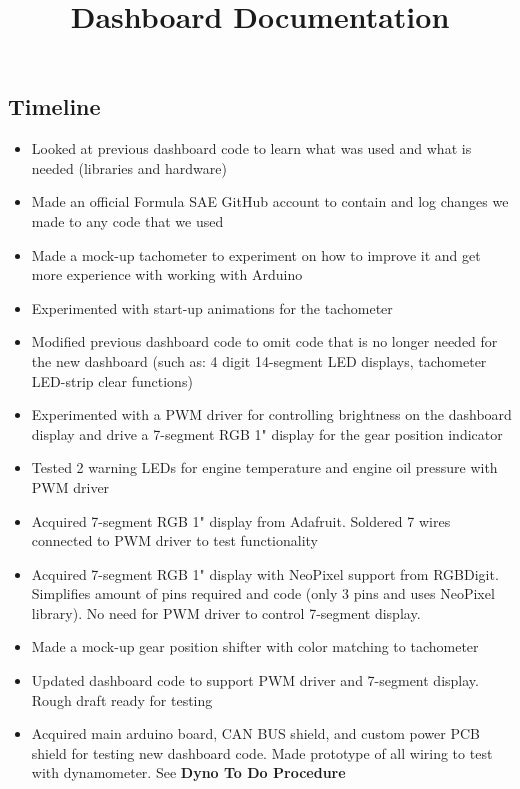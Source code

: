 \documentclass[11pt]{article}
\title{Dashboard Documentation}
\providecommand{\tightlist}{%
      \setlength{\itemsep}{0pt}\setlength{\parskip}{0pt}}
\begin{document}
    
    
    \maketitle
    
    

    
    \subsection{\texorpdfstring{\textbf{Timeline}}{Timeline}}\label{timeline}

\begin{itemize}
\tightlist
\item
  Looked at previous dashboard code to learn what was used and what is
  needed (libraries and hardware)
\item
  Made an official Formula SAE GitHub account to contain and log changes
  we made to any code that we used
\item
  Made a mock-up tachometer to experiment on how to improve it and get
  more experience with working with Arduino
\item
  Experimented with start-up animations for the tachometer
\item
  Modified previous dashboard code to omit code that is no longer needed
  for the new dashboard (such as: 4 digit 14-segment LED displays,
  tachometer LED-strip clear functions)
\item
  Experimented with a PWM driver for controlling brightness on the
  dashboard display and drive a 7-segment RGB 1" display for the gear
  position indicator
\item
  Tested 2 warning LEDs for engine temperature and engine oil pressure
  with PWM driver
\item
  Acquired 7-segment RGB 1" display from Adafruit. Soldered 7 wires
  connected to PWM driver to test functionality
\item
  Acquired 7-segment RGB 1" display with NeoPixel support from RGBDigit.
  Simplifies amount of pins required and code (only 3 pins and uses
  NeoPixel library). No need for PWM driver to control 7-segment
  display.
\item
  Made a mock-up gear position shifter with color matching to tachometer
\item
  Updated dashboard code to support PWM driver and 7-segment display.
  Rough draft ready for testing
\item
  Acquired main arduino board, CAN BUS shield, and custom power PCB
  shield for testing new dashboard code. Made prototype of all wiring to
  test with dynamometer. See \textbf{Dyno To Do Procedure}
\end{itemize}
\end{document}
